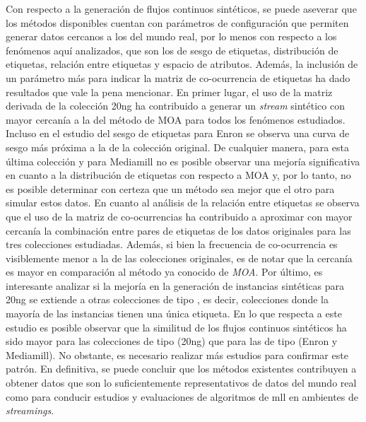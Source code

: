 Con respecto a la generación de flujos continuos sintéticos, se puede aseverar
que los métodos disponibles cuentan con parámetros de configuración que permiten
generar datos cercanos a los del mundo real, por lo menos con respecto a los
fenómenos aquí analizados, que son los de sesgo de etiquetas, distribución de
etiquetas, relación entre etiquetas y espacio de atributos.  Además, la
inclusión de un parámetro más para indicar la matriz de co-ocurrencia de
etiquetas ha dado resultados que vale la pena mencionar. En primer lugar, el uso
de la matriz derivada de la colección 20ng ha contribuido a generar un
\textit{stream} sintético con mayor cercanía a la del método de MOA para todos
los fenómenos estudiados. Incluso en el estudio del sesgo de etiquetas para
Enron se observa una curva de sesgo más próxima a la de la colección original.
De cualquier manera, para esta última colección y para Mediamill no es posible
observar una mejoría significativa en cuanto a la distribución de etiquetas con
respecto a MOA y, por lo tanto, no es posible determinar con certeza que un
método sea mejor que el otro para simular estos datos. En cuanto al análisis de
la relación entre etiquetas se observa que el uso de la matriz de co-ocurrencias
ha contribuido a aproximar con mayor cercanía la combinación entre pares de
etiquetas de los datos originales para las tres colecciones estudiadas. Además,
si bien la frecuencia de co-ocurrencia es visiblemente menor a la de las
colecciones originales, es de notar que la cercanía es mayor en comparación al
método ya conocido de \textit{MOA}\@. Por último, es interesante analizar si la
mejoría en la generación de instancias sintéticas para 20ng se extiende a otras
colecciones de tipo , es decir, colecciones donde la mayoría de las
instancias tienen una única etiqueta. En lo que respecta a este estudio es
posible observar que la similitud de los flujos continuos sintéticos ha sido
mayor para las colecciones de tipo  (20ng) que para las de tipo
 (Enron y Mediamill). No obstante, es necesario realizar más
estudios para confirmar este patrón.  En definitiva, se puede concluir que los
métodos existentes contribuyen a obtener datos que son lo suficientemente
representativos de datos del mundo real como para conducir estudios y
evaluaciones de algoritmos de \acrshort{mll} en ambientes de
\textit{streamings}.

